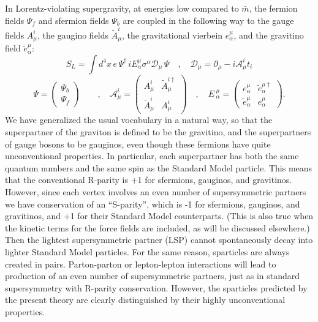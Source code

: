 \documentclass{ws-procs9x6}
\begin{document}
In Lorentz-violating supergravity\cite{allen-2003}, at energies low
compared to $\bar{m}$, the fermion fields $\Psi _{f}$ and sfermion fields
$\Psi _{b}$ are coupled in the following way to the gauge fields
$A_{\mu }^{i}$, the gaugino fields $\tilde{A}_{\mu }^{i}$, the gravitational
vierbein $e_{\alpha }^{\mu }$, and the gravitino field
$\tilde{e}_{\alpha }^{\mu }$:
\begin{equation}
S_{L}=\int d^{4}x\,e\,\Psi ^{\dagger }\,iE_{\alpha }^{\mu }\sigma ^{\alpha }
\mathcal{D}_{\mu }\,\Psi \quad , \quad
\mathcal{D}_{\mu }=\partial _{\mu }-i\mathcal{A}_{\mu }^{i}t_{i} 
\end{equation}
\begin{equation}
\Psi =\left(
\begin{array}{c}
\Psi _{b} \\
\Psi _{f}
\end{array}
\right) \qquad ,\quad \mathcal{A}_{\mu }^{i}=\left(
\begin{array}{ll}
A_{\mu }^{i} & \tilde{A}_{\mu }^{i\dagger } \\
\tilde{A}_{\mu }^{i} & A_{\mu }^{i}
\end{array}
\right) \quad ,\quad E\,_{\alpha }^{\mu }=\left(
\begin{array}{ll}
e_{\alpha }^{\mu } & \tilde{e}_{\alpha }^{\mu \dagger } \\
\tilde{e}_{\alpha }^{\mu } & e_{\alpha }^{\mu }
\end{array}
\right) .
\end{equation}
We have generalized the usual vocabulary in a natural way,
so that the superpartner of the graviton is defined to be
the gravitino, and the superpartners of gauge bosons to be gauginos, even
though these fermions have quite unconventional properties. In particular,
each superpartner has both the same quantum numbers and the same spin as the
Standard Model particle. This means that the conventional R-parity is +1 for
sfermions, gauginos, and gravitinos. However, since each vertex involves
an even number of
supersymmetric partners we have conservation of an ``S-parity'', which
is -1 for sfermions, gauginos, and gravitinos, and +1 for their Standard Model
counterparts. (This is also true when the kinetic terms for the
force fields are included, as will be discussed elsewhere.) Then the lightest
supersymmetric partner (LSP) cannot spontaneously decay into lighter
Standard Model particles. For the same reason, sparticles are always created
in pairs. Parton-parton or lepton-lepton interactions will lead to
production of an even number of supersymmetric partners, just as in
standard supersymmetry with R-parity conservation. However, the sparticles
predicted by the present theory are clearly distinguished by their highly
unconventional properties.
\end{document}
